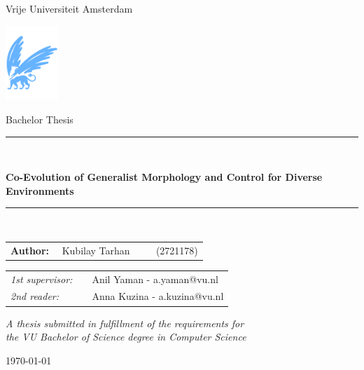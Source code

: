 \documentclass[11pt]{article}
\begin{document}
\thispagestyle{empty}

\begin{center}

      Vrije Universiteit Amsterdam

      \vspace{1mm}

      \includegraphics[height=28mm]{./resources/vu-griffioen.pdf}

      \vspace{1.5cm}

      {\Large Bachelor Thesis}

      \vspace*{1.5cm}

      \rule{.9\linewidth}{.6pt}\\[0.4cm]
      {\huge \bfseries Co-Evolution of Generalist Morphology and Control for Diverse Environments\par}
      \vspace{0.4cm}
      \rule{.9\linewidth}{.6pt}\\[1.5cm]

      \vspace*{2mm}

      {\Large
            \begin{tabular}{l}
                  {\bf Author:} ~~Kubilay Tarhan ~~~~ (2721178)
            \end{tabular}
      }

      \vspace*{1.5cm}

      \begin{tabular}{ll}
            {\it 1st supervisor:}   & ~~Anil Yaman - a.yaman@vu.nl                               \\
            {\it 2nd reader:}       & ~~Anna Kuzina - a.kuzina@vu.nl
      \end{tabular}

      \vspace*{2cm}

      \textit{A thesis submitted in fulfillment of the requirements for\\ the VU Bachelor of Science degree in Computer Science }

      \vspace*{1cm}

      \today\\[4cm] %

\end{center}

\twocolumn









\printbibliography
\end{document}
